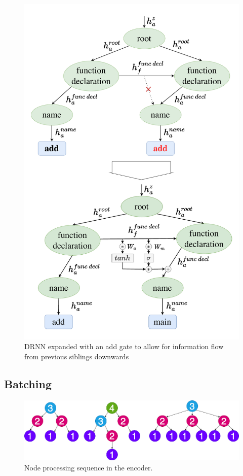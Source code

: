 \begin{figure}
    \centering
    \includegraphics[width=\linewidth]{images/TreeAddGate.pdf}
    \caption{DRNN expanded with an add gate to allow for information flow from previous siblings downwards}
    \label{fig:treeAddGate}
\end{figure}

\newpage
\subsection{Batching}

\begin{figure}
    \centering
    \includegraphics[width=\linewidth]{images/TreeBatchingEncoder.png}
    \caption{Node processing sequence in the encoder.}
    \label{fig:treeBatchingEncoder}
\end{figure}

